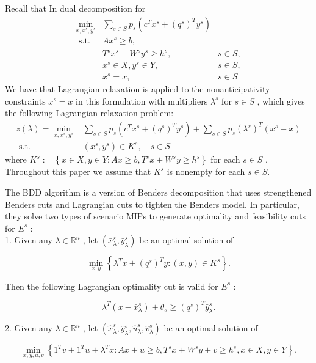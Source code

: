 \documentclass{article}
\theoremstyle{plain}
\theoremstyle{definition}
\begin{document}
Recall that In dual decomposition for
$$
\begin{array}{lll}
\min _{x, x^{s}, y^{s}} & \sum_{s \in S} p_{s}\left(c^{T} x^{s}+\left(q^{s}\right)^{T} y^{s}\right) \\
\text { s.t. } & A x^{s} \geq b, & \\
& T^{s} x^{s}+W^{s} y^{s} \geq h^{s}, & s \in S, \\
& x^{s} \in X, y^{s} \in Y, & s \in S, \\
& x^{s}=x, & s \in S
\end{array}
$$
We have that Lagrangian relaxation is applied to the nonanticipativity constraints  $x^{s}=x$  in this formulation with multipliers  $\lambda^{s}$  for  $s \in S$ , which gives the following Lagrangian relaxation problem:
$$
\begin{aligned}
z(\lambda)=\min _{x, x^{s}, y^{s}} & \sum_{s \in S} p_{s}\left(c^{T} x^{s}+\left(q^{s}\right)^{T} y^{s}\right)+\sum_{s \in S} p_{s}\left(\lambda^{s}\right)^{T}\left(x^{s}-x\right) \\
\text { s.t. } &\left(x^{s}, y^{s}\right) \in K^{s}, \quad s \in S
\end{aligned}
$$
where  $K^{s}:=\left\{x \in X, y \in Y: A x \geq b, T^{s} x+W^{s} y \geq h^{s}\right\}$  for each  $s \in S$ . Throughout this paper we assume that  $K^{s}$  is nonempty for each  $s \in S$. 

The BDD algorithm is a version of Benders decomposition that uses strengthened Benders cuts and Lagrangian cuts to tighten the Benders model. In particular, they solve two types of scenario MIPs to generate optimality and feasibility cuts for  $E^{s}$  :\\

1. Given any  $\lambda \in \mathbb{R}^{n}$ , let  $\left(\bar{x}_{\lambda}^{s}, \bar{y}_{\lambda}^{s}\right) $ be an optimal solution of

$$\min _{x, y}\left\{\lambda^{T} x+\left(q^{s}\right)^{T} y:(x, y) \in K^{s}\right\} .$$

Then the following Lagrangian optimality cut is valid for  $E^{s}$  :

$$\lambda^{T}\left(x-\bar{x}_{\lambda}^{s}\right)+\theta_{s} \geq\left(q^{s}\right)^{T} \bar{y}_{\lambda}^{s} .$$

2. Given any  $\lambda \in \mathbb{R}^{n}$ , let  $\left(\hat{x}_{\lambda}^{s}, \hat{y}_{\lambda}^{s}, \hat{u}_{\lambda}^{s}, \hat{v}_{\lambda}^{s}\right)$  be an optimal solution of

$$\min _{x, y, u, v}\left\{1^{T} v+1^{T} u+\lambda^{T} x: A x+u \geq b, T^{s} x+W^{s} y+v \geq h^{s}, x \in X, y \in Y\right\} .$$
\end{document}

